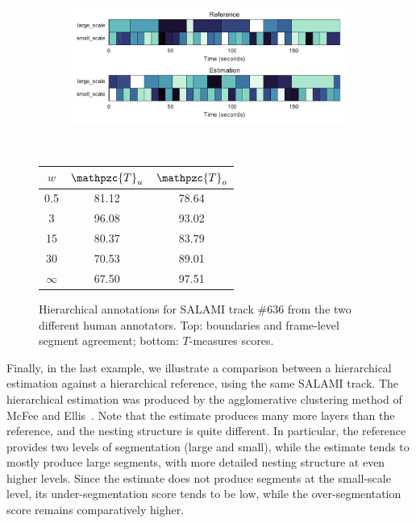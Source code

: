 \documentclass{article}
\def\shag{\ensuremath{\mathpzc{T}}}
\begin{document}
\begin{figure}[t]
  \centering
  \begin{subfigure}{0.5\textwidth}
    \centering
    \includegraphics[width=0.99\textwidth]{figs/SALAMI-SALAMI.pdf}
  \end{subfigure}%
  \\
  \begin{minipage}{0.5\textwidth}
    \centering
    \vspace{10pt}
    \begin{tabular}{|c|c|c|}
      \hline
      $w$       & $\shag_u$       & $\shag_o$      \\
      \hline
      0.5       & 81.12       & 78.64      \\     
      3         & 96.08       & 93.02      \\
      15        & 80.37       & 83.79    \\
      30        & 70.53       & 89.01    \\
      $\infty$  & 67.50       & 97.51    \\
      \hline
    \end{tabular}
  \end{minipage}
  \caption{Hierarchical annotations for SALAMI track \#636 from the two different human annotators. Top: boundaries and frame-level segment agreement; bottom: $T$-measures scores.}
  \label{fig:SALAMI-SALAMI}
\end{figure}

Finally, in the last example, we illustrate a comparison between a hierarchical estimation against a hierarchical reference, using the same SALAMI track.
The hierarchical estimation was produced by the agglomerative clustering method of McFee and Ellis~\cite{McFee2014}.
Note that the estimate produces many more layers than the reference, and the nesting structure is quite different.
In particular, the reference provides two levels of segmentation (large and small), while the estimate tends to mostly produce large segments, with more detailed nesting structure at even higher levels.
Since the estimate does not produce segments at the small-scale level, its under-segmentation score tends to be low, while the over-segmentation score remains comparatively higher.
\end{document}
